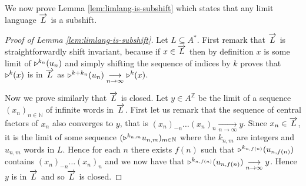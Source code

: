 \medskip


We now prove Lemma \ref{lem:limlang-is-subshift} which states that any limit language $\overrightarrow{L}$ is a subshift.

\begin{proof}[Proof of Lemma \ref{lem:limlang-is-subshift}]
	Let $L\subseteq A^*$.
	First remark that $\overrightarrow{L}$ is straightforwardly shift invariant, because if $x\in\overrightarrow{L}$ then by definition $x$ is some limit of $\shift{k_n}{}(u_n)$ and simply shifting the sequence of indices by $k$ proves that $\shift{k}{}(x)$ is in $\overrightarrow{L}$ as $\shift{k+k_n}{}(u_n)\underset{n\to\infty}{\longrightarrow} \shift{k}{}(x)$.
	
	Now we prove similarly that $\overrightarrow{L}$ is closed. Let $y\in A^{\mathbb{Z}}$ be the limit of a sequence $(x_n)_{n\in\mathbb{N}}$ of infinite words in $\overrightarrow{L}$.
	First let us remark that the sequence of central factors of $x_n$ also converges to $y$, that is $(x_n)_{-n}\dots (x_n)_{n} \underset{n\to\infty}{\longrightarrow} y$.
	Since $x_n\in \overrightarrow{L}$, it is the limit of some sequence $(\shift{k_{n,m}}{}{u_{n,m}})_{m\in\mathbb{N}}$ where the $k_{n,m}$ are integers and $u_{n,m}$ words in $L$. Hence for each $n$  there exists $f(n)$ such that $\shift{k_{n,f(n)}}{}(u_{n,f(n)})$ contains $(x_n)_{-n}\dots (x_n)_{n}$ and we now have that $\shift{k_{n,f(n)}}{}(u_{n,f(n)}) \underset{n\to\infty}{\longrightarrow} y$. Hence $y$ is in $\overrightarrow{L}$ and so $\overrightarrow{L}$ is closed.
\end{proof}


